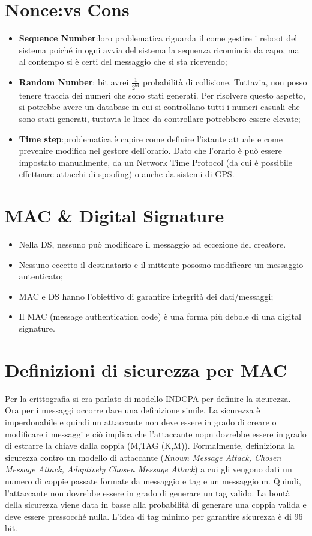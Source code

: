 \documentclass{book}
\theoremstyle{remark}
\begin{document}
\section{Nonce:\@Pro vs Cons}
\begin{itemize}
	\item \textbf{Sequence Number}:\@la loro problematica riguarda il come gestire i reboot del sistema poiché in ogni avvia del sistema la sequenza ricomincia da capo, ma al contempo si è certi del messaggio che si sta ricevendo;\@
	\item \textbf{Random Number}: bit avrei \( \frac{1}{2^{64}} \) probabilità di collisione\@. Tuttavia, non posso tenere traccia dei numeri che sono stati generati\@. Per risolvere questo aspetto, si potrebbe avere un database in cui si controllano tutti i numeri casuali che sono stati generati, tuttavia le linee da controllare potrebbero essere elevate;\@
	\item \textbf{Time step}:\@La problematica è capire come definire l'istante attuale e come prevenire modifica nel gestore dell'orario\@. Dato che l'orario è può essere impostato manualmente, da un Network Time Protocol (da cui è possibile effettuare attacchi di spoofing) o anche da sistemi di GPS\@.
\end{itemize}

\section{MAC \& Digital Signature}
\begin{itemize}
	\item Nella DS, nessuno può modificare il messaggio ad eccezione del creatore\@.
	\item Nessuno eccetto il destinatario e il mittente pososno modificare un messaggio autenticato;\@
	\item MAC e DS hanno l'obiettivo di garantire integrità dei dati/messaggi;\@
	\item Il MAC (message authentication code) è una forma più debole di una digital signature\@.
\end{itemize}
\section{Definizioni di sicurezza per MAC}
Per la crittografia si era parlato di modello INDCPA per definire la sicurezza\@. Ora per i messaggi occorre dare una definizione simile\@.
La sicurezza è imperdonabile e quindi un attaccante non deve essere in grado di creare o modificare i messaggi e ciò implica che l'attaccante nopn dovrebbe essere in grado di estrarre la chiave dalla coppia (M,TAG (K,M))\@.
Formalmente, definiziona la sicurezza contro un modello di attaccante (\emph{Known Message Attack, Chosen Message Attack, Adaptively Chosen Message Attack}) a cui gli vengono dati un numero di coppie passate formate da messaggio e tag e un messaggio m\@. Quindi, l'attaccante non dovrebbe essere in grado di generare un tag valido\@. La bontà della sicurezza viene data in basse alla probabilità di generare una coppia valida e deve essere pressocché nulla\@.
L'idea di tag minimo per garantire sicurezza è di 96 bit\@.
\end{document}
